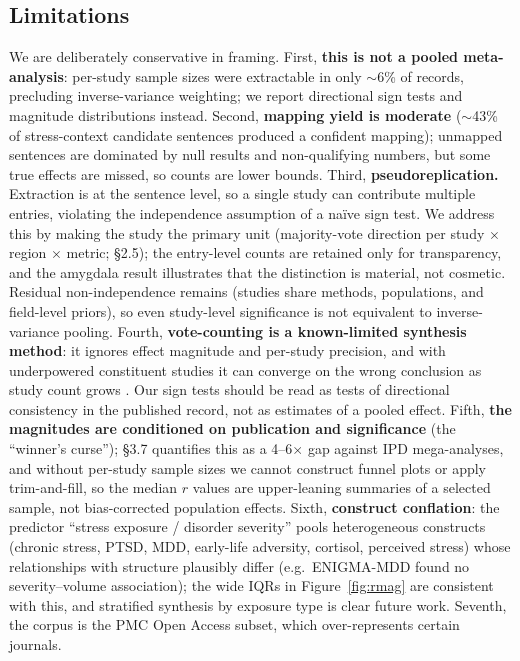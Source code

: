 \documentclass[11pt]{article}
\begin{document}
\subsection{Limitations}
We are deliberately conservative in framing. First, \textbf{this is not a pooled
meta-analysis}: per-study sample sizes were extractable in only $\sim$6\% of
records, precluding inverse-variance weighting; we report directional sign tests
and magnitude distributions instead. Second, \textbf{mapping yield is moderate}
($\sim$43\% of stress-context candidate sentences produced a confident mapping);
unmapped sentences are dominated by null results and non-qualifying numbers, but
some true effects are missed, so counts are lower bounds. Third,
\textbf{pseudoreplication.} Extraction is at the sentence level, so a single
study can contribute multiple entries, violating the independence assumption of a
naïve sign test. We address this by making the study the primary unit
(majority-vote direction per study $\times$ region $\times$ metric; \S2.5); the
entry-level counts are retained only for transparency, and the amygdala result
illustrates that the distinction is material, not cosmetic. Residual
non-independence remains (studies share methods, populations, and field-level
priors), so even study-level significance is not equivalent to inverse-variance
pooling. Fourth, \textbf{vote-counting is a known-limited synthesis method}: it
ignores effect magnitude and per-study precision, and with underpowered
constituent studies it can converge on the wrong conclusion as study count grows
\cite{hedges1985,borenstein2009}. Our sign tests should be read as tests of
directional consistency in the published record, not as estimates of a pooled
effect. Fifth, \textbf{the magnitudes are conditioned on publication and
significance} (the ``winner's curse''); \S3.7 quantifies this as a 4--6$\times$
gap against IPD mega-analyses, and without per-study sample sizes we cannot
construct funnel plots or apply trim-and-fill, so the median $r$ values are
upper-leaning summaries of a selected sample, not bias-corrected population
effects. Sixth, \textbf{construct conflation}: the predictor ``stress exposure /
disorder severity'' pools heterogeneous constructs (chronic stress, PTSD, MDD,
early-life adversity, cortisol, perceived stress) whose relationships with
structure plausibly differ (e.g.\ ENIGMA-MDD found no severity--volume
association); the wide IQRs in Figure~\ref{fig:rmag} are consistent with this,
and stratified synthesis by exposure type is clear future work. Seventh, the
corpus is the PMC Open Access subset, which over-represents certain journals.
\end{document}
